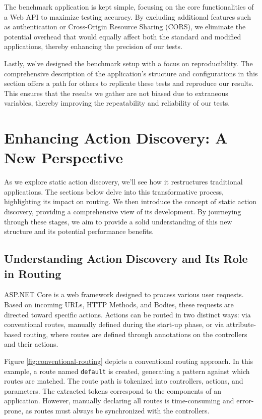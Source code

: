 The benchmark application is kept simple, focusing on the core functionalities of a Web API to maximize testing accuracy. By excluding additional features such as authentication or Cross-Origin Resource Sharing (CORS), we eliminate the potential overhead that would equally affect both the standard and modified applications, thereby enhancing the precision of our tests.

Lastly, we've designed the benchmark setup with a focus on reproducibility. The comprehensive description of the application's structure and configurations in this section offers a path for others to replicate these tests and reproduce our results. This ensures that the results we gather are not biased due to extraneous variables, thereby improving the repeatability and reliability of our tests.

\section{Enhancing Action Discovery: A New Perspective}

As we explore static action discovery, we'll see how it restructures traditional applications. The sections below delve into this transformative process, highlighting its impact on routing. We then introduce the concept of static action discovery, providing a comprehensive view of its development. By journeying through these stages, we aim to provide a solid understanding of this new structure and its potential performance benefits.

\subsection{Understanding Action Discovery and Its Role in Routing}

ASP.NET Core is a web framework designed to process various user requests. Based on incoming URLs, HTTP Methods, and Bodies, these requests are directed toward specific actions. Actions can be routed in two distinct ways: via conventional routes, manually defined during the start-up phase, or via attribute-based routing, where routes are defined through annotations on the controllers and their actions.

Figure \ref{fig:conventional-routing} depicts a conventional routing approach. In this example, a route named \texttt{default} is created, generating a pattern against which routes are matched. The route path is tokenized into controllers, actions, and parameters. The extracted tokens correspond to the components of an application. However, manually declaring all routes is time-consuming and error-prone, as routes must always be synchronized with the controllers.

